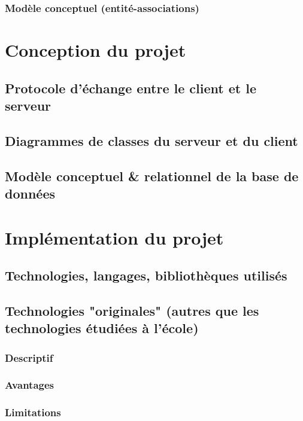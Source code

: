 \documentclass[a4paper,11pt]{article}
\begin{document}
	\subsubsection{Modèle conceptuel (entité-associations)}
	
	
	\section{Conception du projet}
	
	\subsection{Protocole d'échange entre le client et le serveur}
	
	\subsection{Diagrammes de classes du serveur et du client}
	
	\subsection{Modèle conceptuel \& relationnel de la base de données}
	
	
	\section{Implémentation du projet}
	
	\subsection{Technologies, langages, bibliothèques utilisés}
	
	\subsection{Technologies "originales" (autres que les technologies étudiées à l'école)}
	\subsubsection{Descriptif}
	\subsubsection{Avantages}
	\subsubsection{Limitations}
\end{document}
